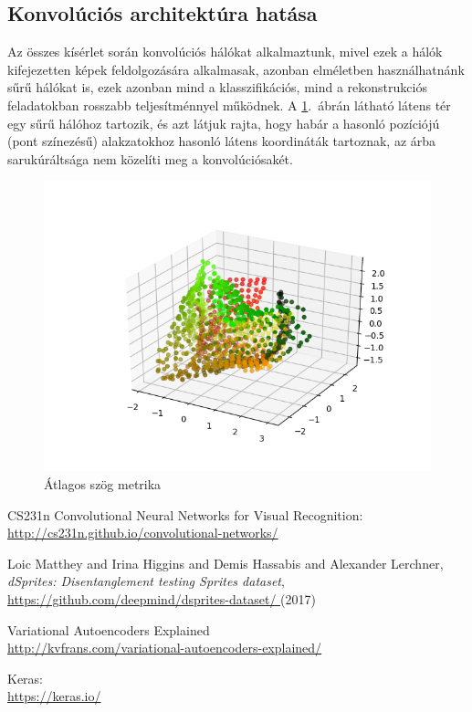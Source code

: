 \subsection{Konvolúciós architektúra hatása}

Az összes kísérlet során konvolúciós hálókat alkalmaztunk, mivel ezek a hálók kifejezetten képek feldolgozására alkalmasak, azonban elméletben használhatnánk sűrű hálókat is, ezek azonban mind a klasszifikációs, mind a rekonstrukciós feladatokban rosszabb teljesítménnyel működnek. A \ref{3D-dense}.~ábrán látható látens tér egy sűrű hálóhoz tartozik, és azt látjuk rajta, hogy habár a hasonló pozíciójú (pont színezésű) alakzatokhoz hasonló látens koordináták tartoznak, az árba sarukúráltsága nem közelíti meg a konvolúciósakét.

\begin{figure}[h!]
\begin{center}
  
  \includegraphics[width=\linewidth]{metrics/3D-dense.png}
  \caption{Átlagos szög metrika}\label{3D-dense}
\end{center}
\end{figure}

\begin{thebibliography}{9}

CS231n Convolutional Neural Networks for Visual Recognition:\\
\url{http://cs231n.github.io/convolutional-networks/}

{Loic Matthey and Irina Higgins and Demis Hassabis and Alexander Lerchner},
\textit{dSprites: Disentanglement testing Sprites dataset},\\
\url{https://github.com/deepmind/dsprites-dataset/
} (2017)

Variational Autoencoders Explained\\
\url{http://kvfrans.com/variational-autoencoders-explained/}

Keras:\\
\url{https://keras.io/}

\end{thebibliography}

%

